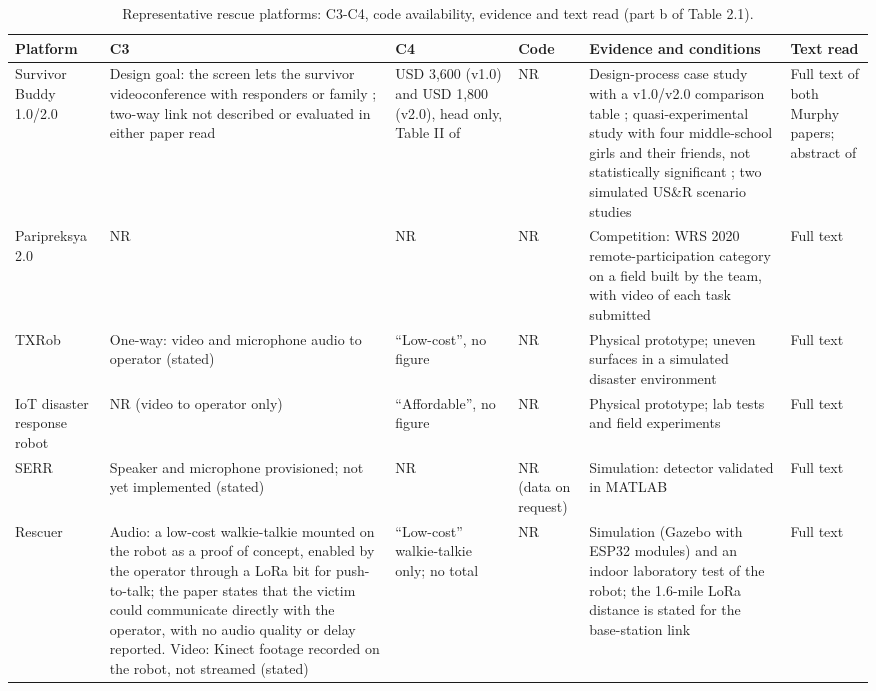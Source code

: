 \begin{center}
\scriptsize
\setlength{\tabcolsep}{3pt}
\begin{longtable}{|p{1.8cm}|p{3.85cm}|p{2.2cm}|p{1.8cm}|p{3.25cm}|p{1.6cm}|}
\caption{Representative rescue platforms: C3-C4, code availability, evidence and text read (part b of Table 2.1).}\\
\hline
\textbf{Platform} & \textbf{C3} & \textbf{C4} & \textbf{Code} & \textbf{Evidence and conditions} & \textbf{Text read} \\
\hline
\endhead
Survivor Buddy 1.0/2.0 \cite{murphy2010,murphy2011} & Design goal: the screen lets the survivor videoconference with responders or family \cite{murphy2010}; two-way link not described or evaluated in either paper read & USD 3,600 (v1.0) and USD 1,800 (v2.0), head only, Table II of \cite{murphy2011} & NR & Design-process case study with a v1.0/v2.0 comparison table \cite{murphy2011}; quasi-experimental study with four middle-school girls and their friends, not statistically significant \cite{murphy2010}; two simulated US\&R scenario studies \cite{srinivasan2012} & Full text of both Murphy papers; abstract of \cite{srinivasan2012} \\
\hline
Paripreksya 2.0 \cite{megalingam2022} & NR & NR & NR & Competition: WRS 2020 remote-participation category on a field built by the team, with video of each task submitted & Full text \\
\hline
TXRob \cite{verano2022} & One-way: video and microphone audio to operator (stated) & ``Low-cost'', no figure & NR & Physical prototype; uneven surfaces in a simulated disaster environment & Full text \\
\hline
IoT disaster response robot \cite{pramono2024} & NR (video to operator only) & ``Affordable'', no figure & NR & Physical prototype; lab tests and field experiments & Full text \\
\hline
SERR \cite{khattab2025} & Speaker and microphone provisioned; not yet implemented (stated) & NR & NR (data on request) & Simulation: detector validated in MATLAB & Full text \\
\hline
Rescuer \cite{manuel2022} & Audio: a low-cost walkie-talkie mounted on the robot as a proof of concept, enabled by the operator through a LoRa bit for push-to-talk; the paper states that the victim could communicate directly with the operator, with no audio quality or delay reported. Video: Kinect footage recorded on the robot, not streamed (stated) & ``Low-cost'' walkie-talkie only; no total & NR & Simulation (Gazebo with ESP32 modules) and an indoor laboratory test of the robot; the 1.6-mile LoRa distance is stated for the base-station link & Full text \\

\end{longtable}
\end{center}
